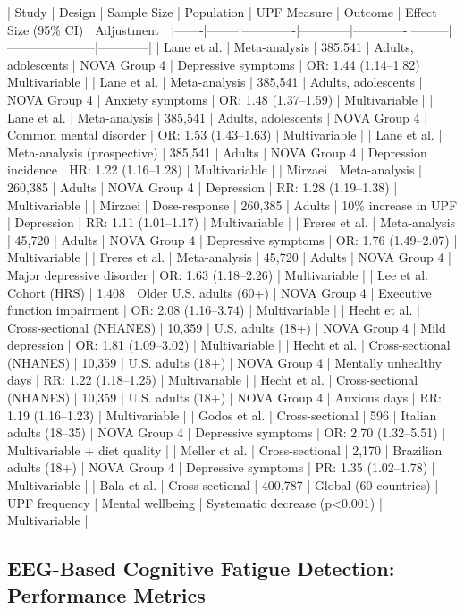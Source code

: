 \documentclass[journal,twoside,10pt]{IEEEtran}
\begin{document}
| Study | Design | Sample Size | Population | UPF Measure | Outcome | Effect Size (95\% CI) | Adjustment |
|-------|--------|-------------|------------|-------------|---------|---------------------|------------|
| Lane et al. \cite{ref21} | Meta-analysis | 385,541 | Adults, adolescents | NOVA Group 4 | Depressive symptoms | OR: 1.44 (1.14--1.82) | Multivariable |
| Lane et al. \cite{ref21} | Meta-analysis | 385,541 | Adults, adolescents | NOVA Group 4 | Anxiety symptoms | OR: 1.48 (1.37--1.59) | Multivariable |
| Lane et al. \cite{ref21} | Meta-analysis | 385,541 | Adults, adolescents | NOVA Group 4 | Common mental disorder | OR: 1.53 (1.43--1.63) | Multivariable |
| Lane et al. \cite{ref21} | Meta-analysis (prospective) | 385,541 | Adults | NOVA Group 4 | Depression incidence | HR: 1.22 (1.16--1.28) | Multivariable |
| Mirzaei \cite{ref27} | Meta-analysis | 260,385 | Adults | NOVA Group 4 | Depression | RR: 1.28 (1.19--1.38) | Multivariable |
| Mirzaei \cite{ref27} | Dose-response | 260,385 | Adults | 10\% increase in UPF | Depression | RR: 1.11 (1.01--1.17) | Multivariable |
| Freres et al. \cite{ref35} | Meta-analysis | 45,720 | Adults | NOVA Group 4 | Depressive symptoms | OR: 1.76 (1.49--2.07) | Multivariable |
| Freres et al. \cite{ref35} | Meta-analysis | 45,720 | Adults | NOVA Group 4 | Major depressive disorder | OR: 1.63 (1.18--2.26) | Multivariable |
| Lee et al. \cite{ref22} | Cohort (HRS) | 1,408 | Older U.S. adults (60+) | NOVA Group 4 | Executive function impairment | OR: 2.08 (1.16--3.74) | Multivariable |
| Hecht et al. \cite{ref20} | Cross-sectional (NHANES) | 10,359 | U.S. adults (18+) | NOVA Group 4 | Mild depression | OR: 1.81 (1.09--3.02) | Multivariable |
| Hecht et al. \cite{ref20} | Cross-sectional (NHANES) | 10,359 | U.S. adults (18+) | NOVA Group 4 | Mentally unhealthy days | RR: 1.22 (1.18--1.25) | Multivariable |
| Hecht et al. \cite{ref20} | Cross-sectional (NHANES) | 10,359 | U.S. adults (18+) | NOVA Group 4 | Anxious days | RR: 1.19 (1.16--1.23) | Multivariable |
| Godos et al. \cite{ref14} | Cross-sectional | 596 | Italian adults (18--35) | NOVA Group 4 | Depressive symptoms | OR: 2.70 (1.32--5.51) | Multivariable + diet quality |
| Meller et al. \cite{ref25} | Cross-sectional | 2,170 | Brazilian adults (18+) | NOVA Group 4 | Depressive symptoms | PR: 1.35 (1.02--1.78) | Multivariable |
| Bala et al. \cite{ref12} | Cross-sectional | 400,787 | Global (60 countries) | UPF frequency | Mental wellbeing | Systematic decrease (p<0.001) | Multivariable |

\subsection{EEG-Based Cognitive Fatigue Detection: Performance Metrics}
\end{document}
